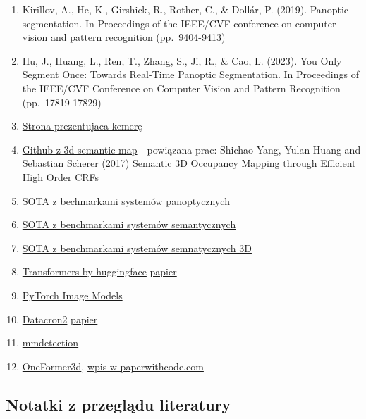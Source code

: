 \documentclass[
]{article}
\begin{document}
\begin{enumerate}
\def\labelenumi{\arabic{enumi}.}
\item
  Kirillov, A., He, K., Girshick, R., Rother, C., \& Dollár, P. (2019). Panoptic segmentation. In Proceedings of the IEEE/CVF conference on computer vision and pattern recognition (pp.~9404-9413)
\item
  Hu, J., Huang, L., Ren, T., Zhang, S., Ji, R., \& Cao, L. (2023). You Only Segment Once: Towards Real-Time Panoptic Segmentation. In Proceedings of the IEEE/CVF Conference on Computer Vision and Pattern Recognition (pp.~17819-17829)
\item
  \href{https://www.intelrealsense.com/depth-camera-d435/}{Strona prezentujaca kemerę}
\item
  \href{https://github.com/shichaoy/semantic_3d_mapping?tab=readme-ov-file}{Github z 3d semantic map} - powiązana prac: Shichao Yang, Yulan Huang and Sebastian Scherer (2017) Semantic 3D Occupancy Mapping through Efficient High Order CRFs
\item
  \href{https://paperswithcode.com/task/panoptic-segmentation}{SOTA z bechmarkami systemów panoptycznych}
\item
  \href{https://paperswithcode.com/task/semantic-segmentation}{SOTA z benchmarkami systemów semantycznych}
\item
  \href{https://paperswithcode.com/task/3d-semantic-segmentation}{SOTA z benchmarkami systemów semnatycznych 3D}
\item
  \href{https://github.com/huggingface/transformers}{Transformers by huggingface} \href{https://aclanthology.org/2020.emnlp-demos.6.pdf}{papier}
\item
  \href{https://github.com/huggingface/pytorch-image-models?tab=readme-ov-file}{PyTorch Image Models}
\item
  \href{https://github.com/facebookresearch/detectron2}{Datacron2} \href{https://github.com/facebookresearch/detectron2/blob/main/MODEL_ZOO.md}{papier}
\item
  \href{https://github.com/open-mmlab/mmdetection}{mmdetection}
\item
  \href{https://arxiv.org/pdf/2311.14405v1}{OneFormer3d}, \href{https://paperswithcode.com/paper/oneformer3d-one-transformer-for-unified-point}{wpis w paperwithcode.com}
\end{enumerate}

\subsection{Notatki z przeglądu literatury}\label{notatki-z-przeglux105du-literatury}
\end{document}
